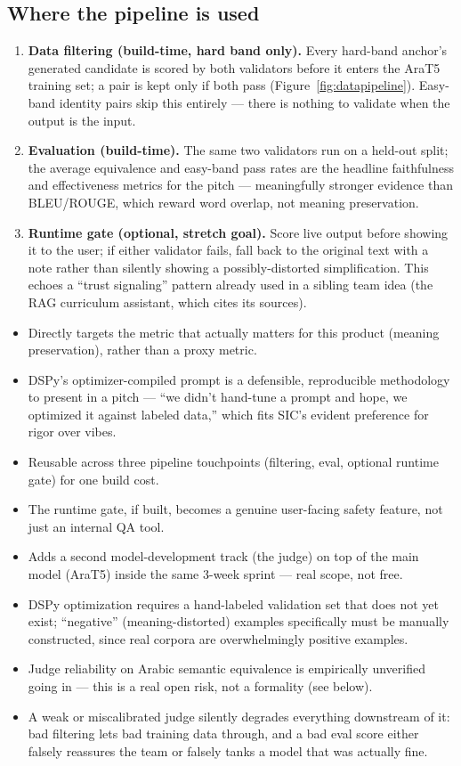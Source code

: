 \documentclass[11pt,a4paper]{article}
\newcommand{\proscons}[2]{%
  \begin{minipage}[t]{0.485\textwidth}
    \begin{prosbox}
      \begin{itemize}[leftmargin=1.1em,itemsep=1pt,topsep=1pt]
        #1
      \end{itemize}
    \end{prosbox}
  \end{minipage}\hfill
  \begin{minipage}[t]{0.485\textwidth}
    \begin{consbox}
      \begin{itemize}[leftmargin=1.1em,itemsep=1pt,topsep=1pt]
        #2
      \end{itemize}
    \end{consbox}
  \end{minipage}
}
\begin{document}
\subsection{Where the pipeline is used}

\begin{enumerate}[leftmargin=1.6em]
  \item \textbf{Data filtering (build-time, hard band only).} Every hard-band
  anchor's generated candidate is scored by both validators before it enters
  the AraT5 training set; a pair is kept only if both pass
  (Figure~\ref{fig:datapipeline}). Easy-band identity pairs skip this
  entirely --- there is nothing to validate when the output is the input.
  \item \textbf{Evaluation (build-time).} The same two validators run on a
  held-out split; the average equivalence and easy-band pass rates are the
  headline faithfulness and effectiveness metrics for the pitch ---
  meaningfully stronger evidence than BLEU/ROUGE, which reward word overlap, not
  meaning preservation.
  \item \textbf{Runtime gate (optional, stretch goal).} Score live output before
  showing it to the user; if either validator fails, fall back to the original text
  with a note rather than silently showing a possibly-distorted simplification.
  This echoes a ``trust signaling'' pattern already used in a sibling team idea
  (the RAG curriculum assistant, which cites its sources).
\end{enumerate}

\proscons{
  \item Directly targets the metric that actually matters for this product
  (meaning preservation), rather than a proxy metric.
  \item DSPy's optimizer-compiled prompt is a defensible, reproducible
  methodology to present in a pitch --- ``we didn't hand-tune a prompt and hope,
  we optimized it against labeled data,'' which fits SIC's evident preference for
  rigor over vibes.
  \item Reusable across three pipeline touchpoints (filtering, eval, optional
  runtime gate) for one build cost.
  \item The runtime gate, if built, becomes a genuine user-facing safety feature,
  not just an internal QA tool.
}{
  \item Adds a second model-development track (the judge) on top of the main
  model (AraT5) inside the same 3-week sprint --- real scope, not free.
  \item DSPy optimization requires a hand-labeled validation set that does not
  yet exist; ``negative'' (meaning-distorted) examples specifically must be
  manually constructed, since real corpora are overwhelmingly positive examples.
  \item Judge reliability on Arabic semantic equivalence is empirically
  unverified going in --- this is a real open risk, not a formality (see below).
  \item A weak or miscalibrated judge silently degrades everything downstream of
  it: bad filtering lets bad training data through, and a bad eval score either
  falsely reassures the team or falsely tanks a model that was actually fine.
}
\end{document}
